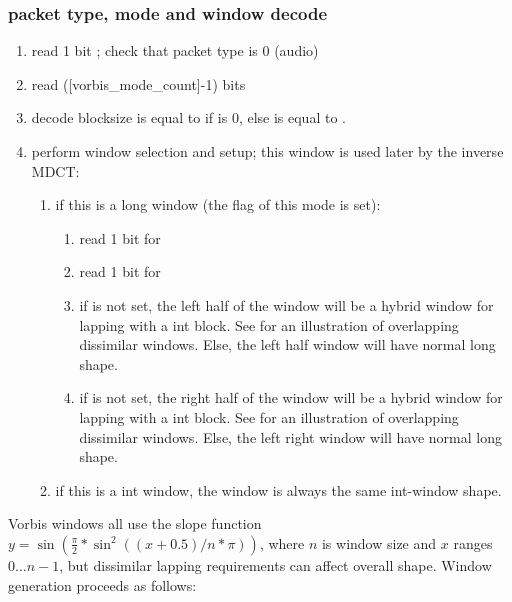 \subsubsection{packet type, mode and window decode}

\begin{enumerate}
 \item read 1 bit ; check that packet type is 0 (audio)
 \item read ([vorbis\_mode\_count]-1) bits
 \item decode blocksize \varname{[n]} is equal to \varname{[blocksize\_0]} if
 is 0, else \varname{[n]} is equal to \varname{[blocksize\_1]}.
 \item perform window selection and setup; this window is used later by the inverse MDCT:
  \begin{enumerate}
   \item if this is a long window (the  flag of this mode is
set):
    \begin{enumerate}
     \item read 1 bit for 
     \item read 1 bit for 
     \item if  is not set, the left half
         of the window will be a hybrid window for lapping with a
         int block.  See  for an illustration of overlapping
dissimilar
         windows. Else, the left half window will have normal long
         shape.
     \item if  is not set, the right half of
         the window will be a hybrid window for lapping with a int
         block.  See  for an
illustration of overlapping dissimilar
         windows. Else, the left right window will have normal long
         shape.
    \end{enumerate}

   \item  if this is a int window, the window is always the same
       int-window shape.
  \end{enumerate}

\end{enumerate}

Vorbis windows all use the slope function $y=\sin(\frac{\pi}{2} * \sin^2((x+0.5)/n * \pi))$,
where $n$ is window size and $x$ ranges $0 \ldots n-1$, but dissimilar
lapping requirements can affect overall shape.  Window generation
proceeds as follows:

